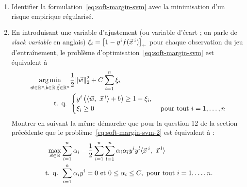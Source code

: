 \documentclass[french,11pt]{article}
\begin{document}
\begin{enumerate}
\item Identifier la formulation~\eqref{eq:soft-margin-svm} avec la minimisation
  d'un risque empirique régularisé.
\item En introduisant une variable d'ajustement (ou variable d'écart ; on
  parle de {\it slack variable} en anglais) 
  $\xi_i = \left[ 1 - y^i f(\xx^i)\right]_+$ pour chaque observation du jeu
  d'entraînement, le problème d'optimisation~\ref{eq:soft-margin-svm} est
  équivalent à
  \begin{align}
    \label{eq:soft-margin-svm-2}
    \argmin_{\ww \in \RR^p, b \in \RR, \xxi \in \RR^n} & \frac{1}{2} \ltwonorm{\ww}^2 + 
                                                         C \sum_{i=1}^n \xi_i  \\
    \nonumber \text{ t. q. }   &
                                 \begin{cases}
                                   y^i \left(\innerproduct{\ww,~\xx^i} + 
                                     b\right) \geq 1 - \xi_i, & \\
                                   \xi_i \geq 0 & \text{ pour tout } i=1, \dots, n
                                 \end{cases}\\
  \end{align}
  Montrer en suivant la même démarche que pour la question 12 de la section précédente que le problème~\eqref{eq:soft-margin-svm-2} est équivalent à :
  \begin{align}
    \label{eq:soft-margin-dual-pb}
    \max_{\aalpha \in \RR} & 
                             \sum_{i=1}^n  \alpha_i- 
                             \frac{1}{2} \sum_{i=1}^n \sum_{l=1}^n \alpha_i \alpha_l y^i y^l \innerproduct{\xx^i,~\xx^l} \\
    \nonumber \text{ t. q. } & \sum_{i=1}^n \alpha_i y^i = 0 \text{ et }  0 \leq \alpha_i
                               \leq C, \text{ pour tout } i=1, \dots, n.
  \end{align}
  

\end{enumerate}
\end{document}
